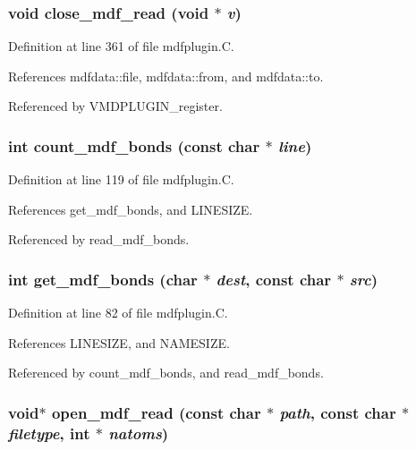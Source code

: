 \subsubsection{\setlength{\rightskip}{0pt plus 5cm}void close\_\-mdf\_\-read (void $\ast$ {\em v})\hspace{0.3cm}{\tt  [static]}}\label{mdfplugin_8C_a10}




Definition at line 361 of file mdfplugin.C.

References mdfdata::file, mdfdata::from, and mdfdata::to.

Referenced by VMDPLUGIN\_\-register.
\subsubsection{\setlength{\rightskip}{0pt plus 5cm}int count\_\-mdf\_\-bonds (const char $\ast$ {\em line})\hspace{0.3cm}{\tt  [static]}}\label{mdfplugin_8C_a6}




Definition at line 119 of file mdfplugin.C.

References get\_\-mdf\_\-bonds, and LINESIZE.

Referenced by read\_\-mdf\_\-bonds.
\subsubsection{\setlength{\rightskip}{0pt plus 5cm}int get\_\-mdf\_\-bonds (char $\ast$ {\em dest}, const char $\ast$ {\em src})\hspace{0.3cm}{\tt  [static]}}\label{mdfplugin_8C_a5}




Definition at line 82 of file mdfplugin.C.

References LINESIZE, and NAMESIZE.

Referenced by count\_\-mdf\_\-bonds, and read\_\-mdf\_\-bonds.
\subsubsection{\setlength{\rightskip}{0pt plus 5cm}void$\ast$ open\_\-mdf\_\-read (const char $\ast$ {\em path}, const char $\ast$ {\em filetype}, int $\ast$ {\em natoms})\hspace{0.3cm}{\tt  [static]}}\label{mdfplugin_8C_a7}




